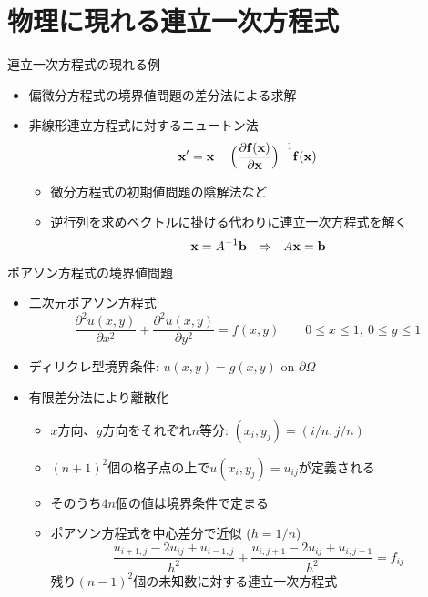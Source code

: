 \section{物理に現れる連立一次方程式}

\begin{frame}[t,fragile]{連立一次方程式の現れる例}
  \begin{itemize}
    \setlength{\itemsep}{1em}
  \item 偏微分方程式の境界値問題の差分法による求解
  \item 非線形連立方程式に対するニュートン法
    \[ {\bf x}' = {\bf x} - \Big( \frac{\partial {\bf f}({\bf x})}{\partial {\bf x}} \Big)^{-1} {\bf f}({\bf x}) \]
    \begin{itemize}
    \item 微分方程式の初期値問題の陰解法など
    \item 逆行列を求めベクトルに掛ける代わりに連立一次方程式を解く
      \[ {\bf x} = A^{-1} {\bf b} \ \ \Rightarrow \ \ A {\bf x} = {\bf b} \]
    \end{itemize}
  \end{itemize}
\end{frame}

\begin{frame}[t,fragile]{ポアソン方程式の境界値問題}
  \begin{itemize}
    \setlength{\itemsep}{1em}
  \item 二次元ポアソン方程式
    \[ \frac{\partial^2 u(x,y)}{\partial x^2} + \frac{\partial^2 u(x,y)}{\partial y^2} = f(x,y) \qquad 0 \le x \le 1, \ 0 \le y \le 1\]
  \item ディリクレ型境界条件: $u(x,y) = g(x,y)$ on $\partial \Omega$
  \item 有限差分法により離散化
    \begin{itemize}
    \item $x$方向、$y$方向をそれぞれ$n$等分: $(x_i,y_j) = (i/n, j/n)$
    \item $(n+1)^2$個の格子点の上で$u(x_i,y_j)=u_{ij}$が定義される
    \item そのうち$4n$個の値は境界条件で定まる
    \item ポアソン方程式を中心差分で近似 ($h=1/n$)
      \[
      \frac{u_{i+1,j}-2u_{ij}+u_{i-1,j}}{h^2} + \frac{u_{i,j+1}-2u_{ij}+u_{i,j-1}}{h^2} = f_{ij}
      \]
      残り$(n-1)^2$個の未知数に対する連立一次方程式
    \end{itemize}
  \end{itemize}
\end{frame}

